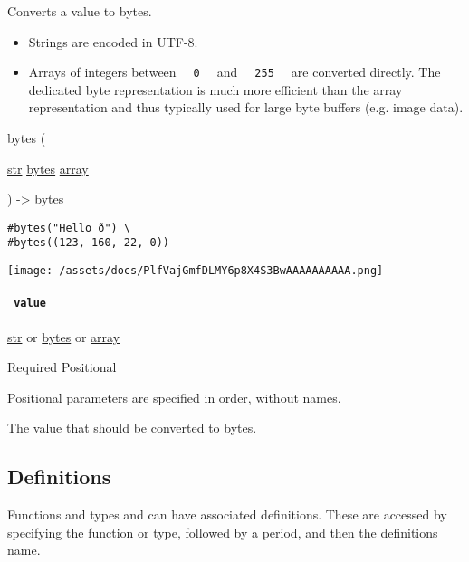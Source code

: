 Converts a value to bytes.

\begin{itemize}
\tightlist
\item
  Strings are encoded in UTF-8.
\item
  Arrays of integers between \texttt{\ }{\texttt{\ 0\ }}\texttt{\ } and
  \texttt{\ }{\texttt{\ 255\ }}\texttt{\ } are converted directly. The
  dedicated byte representation is much more efficient than the array
  representation and thus typically used for large byte buffers (e.g.
  image data).
\end{itemize}

{ bytes } (

{ \href{/docs/reference/foundations/str/}{str}
\href{/docs/reference/foundations/bytes/}{bytes}
\href{/docs/reference/foundations/array/}{array} }

) -\textgreater{} \href{/docs/reference/foundations/bytes/}{bytes}

\begin{verbatim}
#bytes("Hello ð") \
#bytes((123, 160, 22, 0))
\end{verbatim}

\texttt{[image: /assets/docs/PlfVajGmfDLMY6p8X4S3BwAAAAAAAAAA.png]}

\paragraph{\texorpdfstring{\texttt{\ value\ }}{ value }}\label{constructor-value}

\href{/docs/reference/foundations/str/}{str} {or}
\href{/docs/reference/foundations/bytes/}{bytes} {or}
\href{/docs/reference/foundations/array/}{array}

{Required} {{ Positional }}

\label{constructor-value-positional-tooltip}
Positional parameters are specified in order, without names.

The value that should be converted to bytes.

\subsection{\texorpdfstring{{ Definitions
}}{ Definitions }}\label{definitions}

\label{definitions-tooltip}
Functions and types and can have associated definitions. These are
accessed by specifying the function or type, followed by a period, and
then the definition\textquotesingle s name.

